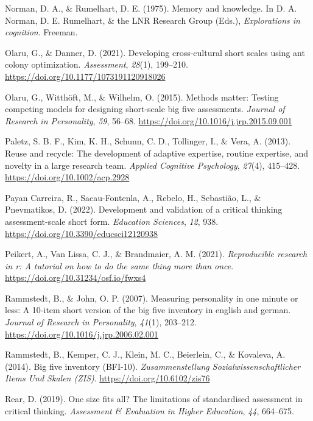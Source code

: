 \documentclass[
  12pt,
  a4paper,
  twoside]{article}
\newlength{\cslhangindent}
\newenvironment{CSLReferences}[2] %
 {\begin{list}{}{%
  \setlength{\itemindent}{0pt}
  \setlength{\leftmargin}{0pt}
  \setlength{\parsep}{0pt}
  \ifodd #1
   \setlength{\leftmargin}{\cslhangindent}
   \setlength{\itemindent}{-1\cslhangindent}
  \fi
  \setlength{\itemsep}{#2\baselineskip}}}
 {\end{list}}
\begin{document}
\begin{CSLReferences}{1}{0}
Norman, D. A., \& Rumelhart, D. E. (1975). Memory and knowledge. In D. A. Norman, D. E. Rumelhart, \& the LNR Research Group (Eds.), \emph{Explorations in cognition}. Freeman.

Olaru, G., \& Danner, D. (2021). Developing cross-cultural short scales using ant colony optimization. \emph{Assessment}, \emph{28}(1), 199--210. \url{https://doi.org/10.1177/1073191120918026}

Olaru, G., Witthöft, M., \& Wilhelm, O. (2015). Methods matter: Testing competing models for designing short-scale big five assessments. \emph{Journal of Research in Personality}, \emph{59}, 56--68. \url{https://doi.org/10.1016/j.jrp.2015.09.001}

Paletz, S. B. F., Kim, K. H., Schunn, C. D., Tollinger, I., \& Vera, A. (2013). Reuse and recycle: The development of adaptive expertise, routine expertise, and novelty in a large research team. \emph{Applied Cognitive Psychology}, \emph{27}(4), 415--428. \url{https://doi.org/10.1002/acp.2928}

Payan Carreira, R., Sacau-Fontenla, A., Rebelo, H., Sebastião, L., \& Pnevmatikos, D. (2022). Development and validation of a critical thinking assessment-scale short form. \emph{Education Sciences}, \emph{12}, 938. \url{https://doi.org/10.3390/educsci12120938}

Peikert, A., Van Lissa, C. J., \& Brandmaier, A. M. (2021). \emph{Reproducible research in r: A tutorial on how to do the same thing more than once}. \url{https://doi.org/10.31234/osf.io/fwxs4}

Rammstedt, B., \& John, O. P. (2007). Measuring personality in one minute or less: A 10-item short version of the big five inventory in english and german. \emph{Journal of Research in Personality}, \emph{41}(1), 203--212. \url{https://doi.org/10.1016/j.jrp.2006.02.001}

Rammstedt, B., Kemper, C. J., Klein, M. C., Beierlein, C., \& Kovaleva, A. (2014). Big five inventory (BFI-10). \emph{Zusammenstellung Sozialwissenschaftlicher Items Und Skalen (ZIS)}. \url{https://doi.org/10.6102/zis76}

Rear, D. (2019). One size fits all? The limitations of standardised assessment in critical thinking. \emph{Assessment \& Evaluation in Higher Education}, \emph{44}, 664--675.


\end{CSLReferences}
\end{document}
